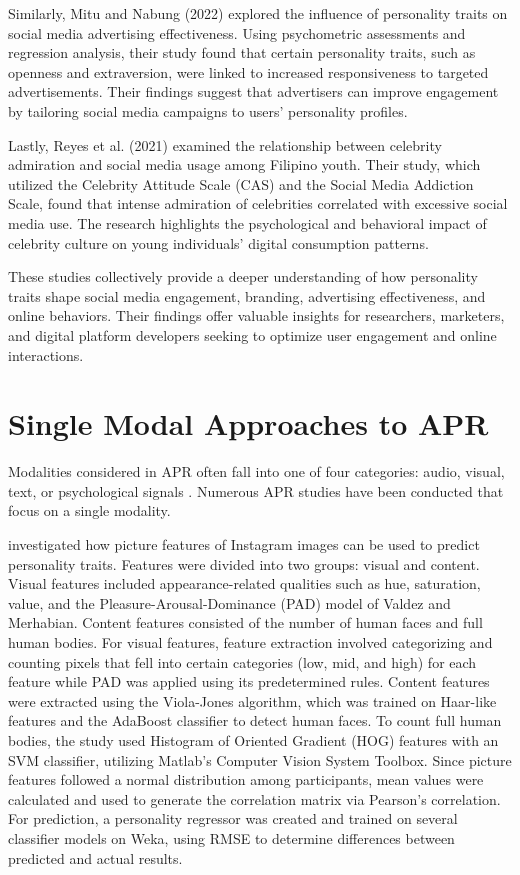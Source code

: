 Similarly, Mitu and Nabung (2022) explored the influence of personality traits on social media advertising effectiveness. Using psychometric assessments and regression analysis, their study found that certain personality traits, such as openness and extraversion, were linked to increased responsiveness to targeted advertisements. Their findings suggest that advertisers can improve engagement by tailoring social media campaigns to users' personality profiles.

Lastly, Reyes et al. (2021) examined the relationship between celebrity admiration and social media usage among Filipino youth. Their study, which utilized the Celebrity Attitude Scale (CAS) and the Social Media Addiction Scale, found that intense admiration of celebrities correlated with excessive social media use. The research highlights the psychological and behavioral impact of celebrity culture on young individuals’ digital consumption patterns.

These studies collectively provide a deeper understanding of how personality traits shape social media engagement, branding, advertising effectiveness, and online behaviors. Their findings offer valuable insights for researchers, marketers, and digital platform developers seeking to optimize user engagement and online interactions.


\section {Single Modal Approaches to APR}
\label{sec: SMApproaches}
Modalities considered in APR often fall into one of four categories: audio, visual, text, or psychological signals \citep{Zhao2022}. Numerous APR studies have been conducted that focus on a single modality. 

\citet{Ferwerda2016} investigated how picture features of Instagram images can be used to predict personality traits. Features were divided into two groups: visual and content. Visual features included appearance-related qualities such as hue, saturation, value, and the Pleasure-Arousal-Dominance (PAD) model of Valdez and Merhabian. Content features consisted of the number of human faces and full human bodies. For visual features, feature extraction involved categorizing and counting pixels that fell into certain categories (low, mid, and high) for each feature while PAD was applied using its predetermined rules. Content features were extracted using the Viola-Jones algorithm, which was trained on Haar-like features and the AdaBoost classifier to detect human faces. To count full human bodies, the study used Histogram of Oriented Gradient (HOG) features with an SVM classifier, utilizing Matlab’s Computer Vision System Toolbox. Since picture features followed a normal distribution among participants, mean values were calculated and used to generate the correlation matrix via Pearson’s correlation. For prediction, a personality regressor was created and trained on several classifier models on Weka, using RMSE to determine differences between predicted and actual results. 

